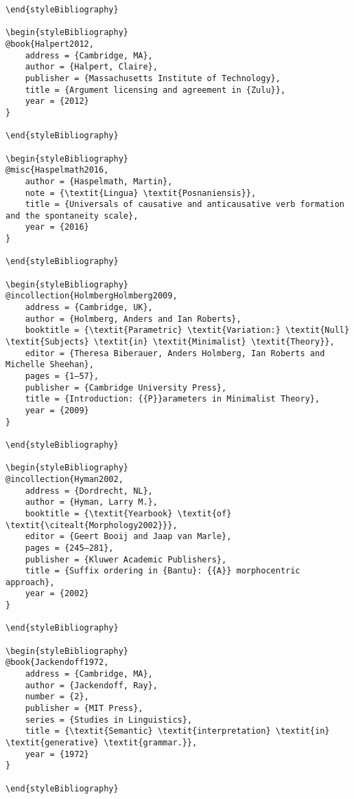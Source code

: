 \documentclass[output=paper,modfonts,nonflat]{langsci/langscibook}
\begin{document}
\begin{verbatim}
\end{styleBibliography}

\begin{styleBibliography}
@book{Halpert2012,
	address = {Cambridge, MA},
	author = {Halpert, Claire},
	publisher = {Massachusetts Institute of Technology},
	title = {Argument licensing and agreement in {Zulu}},
	year = {2012}
}

\end{styleBibliography}

\begin{styleBibliography}
@misc{Haspelmath2016,
	author = {Haspelmath, Martin},
	note = {\textit{Lingua} \textit{Posnaniensis}},
	title = {Universals of causative and anticausative verb formation and the spontaneity scale},
	year = {2016}
}

\end{styleBibliography}

\begin{styleBibliography}
@incollection{HolmbergHolmberg2009,
	address = {Cambridge, UK},
	author = {Holmberg, Anders and Ian Roberts},
	booktitle = {\textit{Parametric} \textit{Variation:} \textit{Null} \textit{Subjects} \textit{in} \textit{Minimalist} \textit{Theory}},
	editor = {Theresa Biberauer, Anders Holmberg, Ian Roberts and Michelle Sheehan},
	pages = {1–57},
	publisher = {Cambridge University Press},
	title = {Introduction: {{P}}arameters in Minimalist Theory},
	year = {2009}
}

\end{styleBibliography}

\begin{styleBibliography}
@incollection{Hyman2002,
	address = {Dordrecht, NL},
	author = {Hyman, Larry M.},
	booktitle = {\textit{Yearbook} \textit{of} \textit{\citealt{Morphology2002}}},
	editor = {Geert Booij and Jaap van Marle},
	pages = {245–281},
	publisher = {Kluwer Academic Publishers},
	title = {Suffix ordering in {Bantu}: {{A}} morphocentric approach},
	year = {2002}
}

\end{styleBibliography}

\begin{styleBibliography}
@book{Jackendoff1972,
	address = {Cambridge, MA},
	author = {Jackendoff, Ray},
	number = {2},
	publisher = {MIT Press},
	series = {Studies in Linguistics},
	title = {\textit{Semantic} \textit{interpretation} \textit{in} \textit{generative} \textit{grammar.}},
	year = {1972}
}

\end{styleBibliography}


\end{verbatim}
\end{document}

